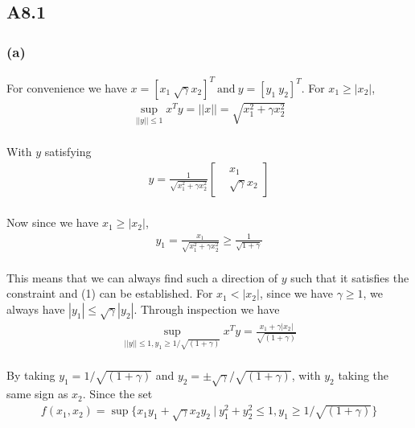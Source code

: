 \subsection*{A8.1}
\subsubsection*{(a)}
\paragraph{}
For convenience we have $x =[x_1\ \sqrt{\gamma }x_2]^T\ \text{and}\ y=[y_1\ y_2]^T$.
For $x_1 \geq |x_2|$,
\begin{align}
\sup_{||y|| \leq 1} x^Ty = ||x|| = \sqrt{x_1^2 + \gamma x_2^2}
\end{align}
\paragraph{}
With $y$ satisfying 
\begin{align*}
y = \frac{1}{\sqrt{x_1^2 + \gamma x_2^2}}\begin{bmatrix}
&x_1 \\&\sqrt{\gamma }x_2
\end{bmatrix}
\end{align*}
\paragraph{}
Now since we have $x_1 \geq |x_2|$,
\begin{align*}
y_1=\frac{x_1}{\sqrt{x_1^2 + \gamma x_2^2}} \geq \frac{1}{\sqrt{1+\gamma}}
\end{align*}
\paragraph{}
This means that we can always find such a direction of $y$ such that it satisfies the constraint and (1) can be established. For $x_1 < |x_2|$, since we have $\gamma \geq 1$, we always have $|y_1| \leq \sqrt{\gamma }|y_2|$. Through inspection we have
\begin{align*}
\sup_{||y|| \leq 1, y_1 \geq 1/\sqrt{(1+\gamma)}}x^Ty = \frac{x_1+ \gamma |x_2|}{\sqrt{(1+\gamma)}} 
\end{align*}
\paragraph{}
By taking $y_1 = 1/ \sqrt{(1+\gamma)}$ and $y_2=\pm\sqrt{\gamma}/ \sqrt{(1+\gamma)}$, with $y_2$ taking the same sign as $x_2$. Since the set
\begin{align*}
f(x_1,x_2) = \sup \{x_1y_1 +\sqrt{\gamma}x_2y_2\ |\ y_1^2+y_2^2 \leq 1, y_1 \geq 1/ \sqrt{(1+\gamma)}\}
\end{align*}
